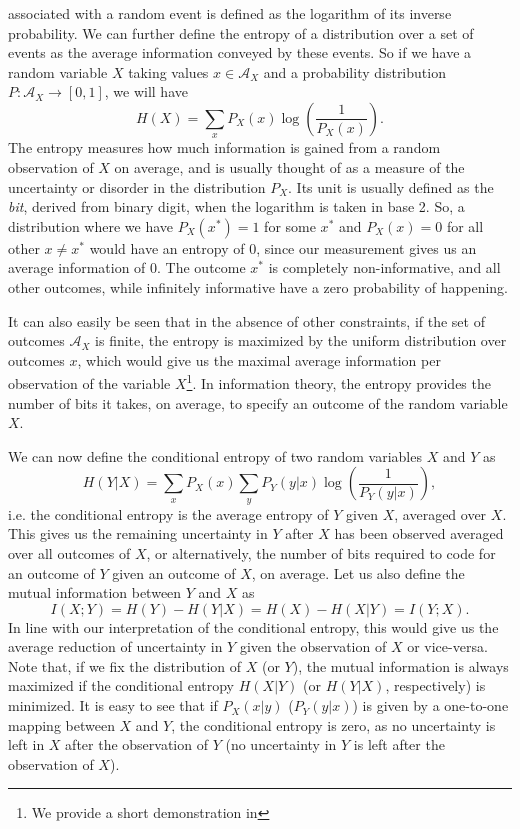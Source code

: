  associated with a random event is defined as the logarithm of its inverse probability. We can further define the entropy of a distribution over a set of events as the average information conveyed by these events. So if we have a random variable $X$ taking values $x \in \mathcal{A}_X$ and a probability distribution $P : \mathcal{A}_X \to [0,1]$, we will have
$$
H(X)= \sum_x P_X(x) \log\left(\frac{1}{P_X(x)}\right).
$$
The entropy measures how much information is gained from a random observation of $X$ on average, and is usually thought of as a measure of the uncertainty or disorder in the distribution $P_X$. Its unit is usually defined as the {\em bit}, derived from binary digit, when the logarithm is taken in base 2. So, a distribution where we have $P_X(x^*) = 1$ for some $x^*$ and $P_X(x) = 0$ for all other $x\neq x^*$ would have an entropy of $0$, since our measurement gives us an average information of $0$. The outcome $x^*$ is completely non-informative, and all other outcomes, while infinitely informative have a zero probability of happening.\par
It can also easily be seen that in the absence of other constraints, if the set of outcomes $\mathcal{A}_X$ is finite, the entropy is maximized by the uniform distribution over outcomes $x$, which would give us the maximal average information per observation of the variable $X$\footnote{We provide a short demonstration in }. In information theory, the entropy provides the number of bits it takes, on average, to specify an outcome of the random variable $X$.\par
We can now define the conditional entropy of two random variables $X$ and $Y$ as
$$
H(Y|X) = \sum_x P_X(x) \sum_y P_Y(y|x) \log\left(\frac{1}{P_Y(y|x)}\right),
$$
i.e. the conditional entropy is the average entropy of $Y$ given $X$, averaged over $X$. This gives us the remaining uncertainty in $Y$ after $X$ has been observed averaged over all outcomes of $X$, or alternatively, the number of bits required to code for an outcome of $Y$ given an outcome of $X$, on average. Let us also define the mutual information between $Y$ and $X$ as
$$
I(X;Y) = H(Y) - H(Y|X) = H(X) - H(X|Y) = I(Y;X).
$$
In line with our interpretation of the conditional entropy, this would give us the average reduction of uncertainty in $Y$ given the observation of $X$ or vice-versa. Note that, if we fix the distribution of $X$ (or $Y$), the mutual information is always maximized if the conditional entropy $H(X|Y)$ (or $H(Y|X)$, respectively) is minimized. It is easy to see that if $P_X(x|y)$ ($P_Y(y|x)$) is given by a one-to-one mapping between $X$ and $Y$, the conditional entropy is zero, as no uncertainty is left in $X$ after the observation of $Y$ (no uncertainty in $Y$ is left after the observation of $X$).\par
